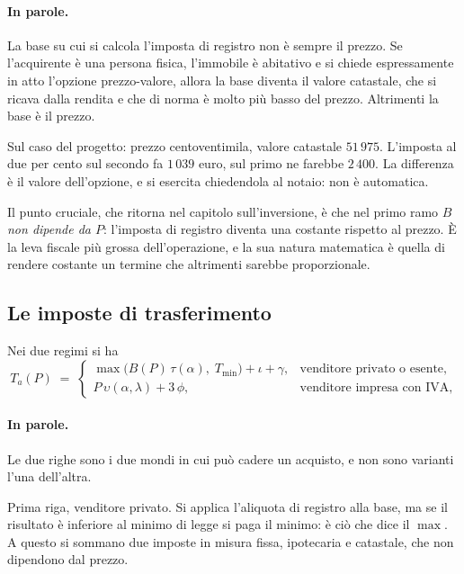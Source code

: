 \documentclass[11pt,a4paper]{article}
\theoremstyle{definition}
\theoremstyle{plain}
\begin{document}
\paragraph{In parole.} La base su cui si calcola l'imposta di registro non è sempre il prezzo. Se l'acquirente è una persona fisica, l'immobile è abitativo e si chiede espressamente in atto l'opzione prezzo-valore, allora la base diventa il valore catastale, che si ricava dalla rendita e che di norma è molto più basso del prezzo. Altrimenti la base è il prezzo.

Sul caso del progetto: prezzo centoventimila, valore catastale $51\,975$. L'imposta al due per cento sul secondo fa $1\,039$ euro, sul primo ne farebbe $2\,400$. La differenza è il valore dell'opzione, e si esercita chiedendola al notaio: non è automatica.

Il punto cruciale, che ritorna nel capitolo sull'inversione, è che nel primo ramo $B$ \emph{non dipende da $P$}: l'imposta di registro diventa una costante rispetto al prezzo. È la leva fiscale più grossa dell'operazione, e la sua natura matematica è quella di rendere costante un termine che altrimenti sarebbe proporzionale.

\subsection{Le imposte di trasferimento}

Nei due regimi si ha
\begin{equation}
T_a(P) \;=\;
\begin{cases}
\max\big(B(P)\,\tau(\alpha),\; T_{\min}\big) + \iota + \gamma, & \text{venditore privato o esente,}\\[0.4em]
P\,\upsilon(\alpha,\lambda) + 3\,\phi, & \text{venditore impresa con IVA,}
\end{cases}
\label{eq:imposte}
\end{equation}

\paragraph{In parole.} Le due righe sono i due mondi in cui può cadere un acquisto, e non sono varianti l'una dell'altra.

Prima riga, venditore privato. Si applica l'aliquota di registro alla base, ma se il risultato è inferiore al minimo di legge si paga il minimo: è ciò che dice il $\max$. A questo si sommano due imposte in misura fissa, ipotecaria e catastale, che non dipendono dal prezzo.
\end{document}

